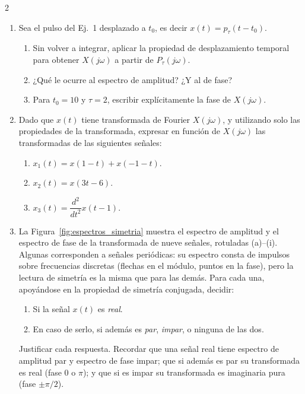 \documentclass[10pt,a4paper]{article}
\begin{document}
\begin{multicols}{2}
\begin{enumerate}
			\textbf{Propiedades de la transformada}
			\item Sea el pulso del Ej.~1 desplazado a $t_0$, es decir $x(t) = p_\tau(t - t_0)$.
			\begin{enumerate}
				\item Sin volver a integrar, aplicar la propiedad de desplazamiento temporal para obtener $X(j\omega)$ a partir de $P_\tau(j\omega)$.
				\item ¿Qué le ocurre al espectro de amplitud? ¿Y al de fase?
				\item Para $t_0 = 10$ y $\tau = 2$, escribir explícitamente la fase de $X(j\omega)$.
			\end{enumerate}

			\item Dado que $x(t)$ tiene transformada de Fourier $X(j\omega)$, y utilizando solo las propiedades de la transformada, expresar en función de $X(j\omega)$ las transformadas de las siguientes señales:
			\begin{enumerate}
				\item $x_1(t) = x(1-t) + x(-1-t)$.
				\item $x_2(t) = x(3t-6)$.
				\item $x_3(t) = \dfrac{d^2}{dt^2}x(t-1)$.
			\end{enumerate}

			\item La Figura~\ref{fig:espectros_simetria} muestra el espectro de amplitud y el espectro de fase de la transformada de nueve señales, rotuladas (a)--(i). Algunas corresponden a señales periódicas: su espectro consta de impulsos sobre frecuencias discretas (flechas en el módulo, puntos en la fase), pero la lectura de simetría es la misma que para las demás. Para cada una, apoyándose en la propiedad de simetría conjugada, decidir:
			\begin{enumerate}
				\item Si la señal $x(t)$ es \emph{real}.
				\item En caso de serlo, si además es \emph{par}, \emph{impar}, o ninguna de las dos.
			\end{enumerate}
			Justificar cada respuesta. Recordar que una señal real tiene espectro de amplitud par y espectro de fase impar; que si además es par su transformada es real (fase $0$ o $\pi$); y que si es impar su transformada es imaginaria pura (fase $\pm\pi/2$).


\end{enumerate}
\end{multicols}
\end{document}
